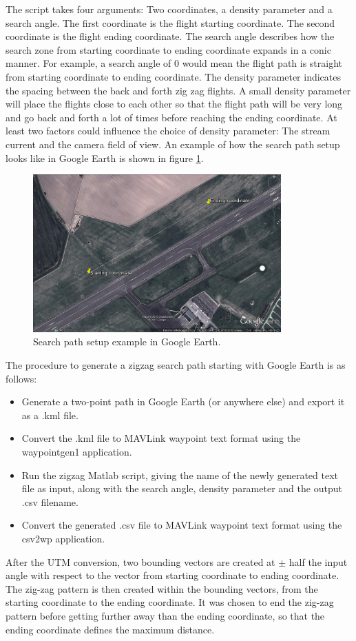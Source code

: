 The script takes four arguments: Two coordinates, a density parameter and a search angle.
The first coordinate is the flight starting coordinate. The second coordinate is the flight ending
coordinate.
The search angle describes how the search zone from starting coordinate to ending coordinate
expands in a conic manner.
For example, a search angle of 0 would mean the flight path is straight from starting coordinate to
ending coordinate.
The density parameter indicates the spacing between the back and forth zig zag flights.
A small density parameter will place the flights close to each other so that
the flight path will be very long and go back and forth a lot of times before reaching the ending
coordinate.
At least two factors could influence the choice of density parameter: The stream current and the camera field of view.
An example of how the search path setup looks like in Google Earth is shown in figure
\ref{fig:googlepath}.
\begin{figure}[ht]
	\centering
	\includegraphics[width=0.85\textwidth]{Images/googlepath}
	\caption[Search path setup.]{Search path setup example in Google Earth.}
	\label{fig:googlepath}
\end{figure}
The procedure to generate a zigzag search path starting with Google Earth is as follows:
\begin{itemize}
\item Generate a two-point path in Google Earth (or anywhere else) and export it as a .kml file.
\item Convert the .kml file to MAVLink waypoint text format using the waypointgen1 application.
\item Run the zigzag Matlab script, giving the name of the newly generated text file as input,
along with the search angle, density parameter and the output .csv filename.
\item Convert the generated .csv file to MAVLink waypoint text format using the csv2wp application.
\end{itemize}
After the UTM conversion, two bounding vectors are created at \(\pm\) half the input angle
with respect to the vector from starting coordinate to ending coordinate.
The zig-zag pattern is then created within the bounding vectors, from the starting coordinate to the
ending coordinate. It was chosen to end the zig-zag pattern before getting further away than the
ending coordinate, so that the ending coordinate defines the maximum distance.

